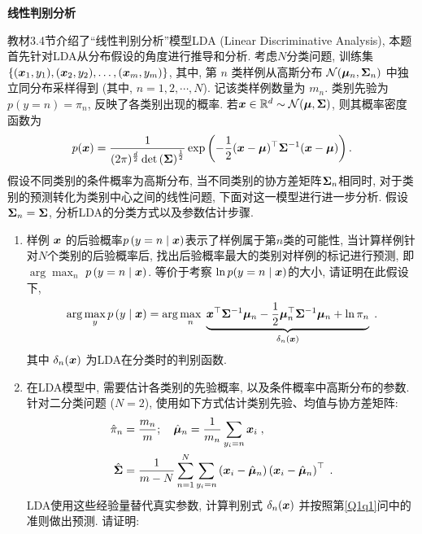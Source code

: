 \documentclass[answers]{exam}  %
\begin{document}
\begin{questions}
  \question [20] \textbf{线性判别分析}

  教材3.4节介绍了“线性判别分析”模型LDA (Linear Discriminative Analysis), 本题首先针对LDA从分布假设的角度进行推导和分析.
  考虑$N$分类问题, 训练集 $\left\{({\boldsymbol{x}}_1,y_1),({\boldsymbol{x}}_2,y_2),\ldots,({\boldsymbol{x}}_m,y_m)\right\}$, 其中, 第 $n$ 类样例从高斯分布 $\mathcal{N}(\boldsymbol{\mu}_n,\boldsymbol{\Sigma}_n)$ 中独立同分布采样得到 (其中, $n=1,2,\cdots,N$). 记该类样例数量为 $m_n$. 类别先验为 $p\left(y=n\right)=\pi_n$, 反映了各类别出现的概率. 若${\boldsymbol{x}}\in \mathbb{R}^d \sim \mathcal{N}(\boldsymbol{\mu},\boldsymbol{\Sigma})$, 则其概率密度函数为
  \begin{align}
    p({\boldsymbol{x}})=\frac{1}{(2\pi)^{\frac{d}{2}}\det\left(\boldsymbol{\Sigma}\right)^\frac{1}{2}}\exp\left(-\frac{1}{2}({\boldsymbol{x}}-\boldsymbol{\mu})^\top\boldsymbol{\Sigma}^{-1}({\boldsymbol{x}}-\boldsymbol{\mu})\right).
  \end{align}
  假设不同类别的条件概率为高斯分布, 当不同类别的协方差矩阵$\boldsymbol{\Sigma}_n$相同时, 对于类别的预测转化为类别中心之间的线性问题, %
  下面对这一模型进行进一步分析.
  假设$\boldsymbol{\Sigma}_n = \boldsymbol{\Sigma}$, 分析LDA的分类方式以及参数估计步骤.
  \begin{enumerate}
    \item \label{Q1q1}样例 ${\boldsymbol{x}}$ 的后验概率$p\left(y=n\mid {\boldsymbol{x}}\right)$表示了样例属于第$n$类的可能性, 当计算样例针对$N$个类别的后验概率后, 找出后验概率最大的类别对样例的标记进行预测, 即 $\arg\max_n$ $p\left(y=n\mid {\boldsymbol{x}}\right)$. 等价于考察 $\ln p(y=n\mid {\boldsymbol{x}})$的大小,  请证明在此假设下,
          \begin{equation}
            \arg\max_y p\left(y\mid {\boldsymbol{x}}\right)=\arg\max_n\; \underbrace{{\boldsymbol{x}}^{\top} \boldsymbol{\Sigma}^{-1} \boldsymbol{\mu}_{n}-\frac{1}{2} \boldsymbol{\mu}_{n}^{\top} \boldsymbol{\Sigma}^{-1} \boldsymbol{\mu}_{n}+\ln \pi_{n}}_{\delta_n({\boldsymbol{x}})}    \;.
          \end{equation}
          其中 $\delta_{n}({\boldsymbol{x}})$ 为LDA在分类时的判别函数.
    \item \label{Q1q2} 在LDA模型中, 需要估计各类别的先验概率, 以及条件概率中高斯分布的参数. 针对二分类问题 ($N=2$), 使用如下方式估计类别先验、均值与协方差矩阵:
          \begin{align}
            \hat{\pi}_{n} & =\frac{m_n}{m}; \quad
            \hat{\boldsymbol{\mu}}_{n}=\frac{1}{m_n}\sum_{y_{i}=n} {\boldsymbol{x}}_{i}\;,                                                                                       \\
            \hat{\boldsymbol{\Sigma}} & =\frac{1}{m-N}\sum_{n=1}^{N} \sum_{y_{i}=n}\left({\boldsymbol{x}}_{i}-\hat{\boldsymbol{\mu}}_{n}\right)\left({\boldsymbol{x}}_{i}-\hat{\boldsymbol{\mu}}_{n}\right)^{\top}\;.
          \end{align}
          LDA使用这些经验量替代真实参数, 计算判别式 $\delta_n({\boldsymbol{x}})$ 并按照第\ref{Q1q1}问中的准则做出预测. 请证明:

\end{enumerate}
\end{questions}
\end{document}
